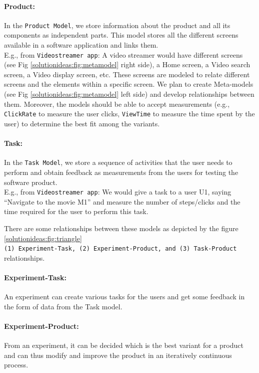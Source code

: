 \paragraph{Product:} In the \texttt{Product Model}, we store information about the product and all its components as independent parts.
This model stores all the different screens available in a software application and links them.\\
E.g., from \texttt{Videostreamer app}: A video streamer would have different screens (see Fig \ref{solutionideas:fig:metamodel} right side), a Home screen, a Video search screen, a Video display screen, etc. 
These screens are modeled to relate different screens and the elements within a specific screen. 
We plan to create Meta-models  (see Fig \ref{solutionideas:fig:metamodel} left side) and develop relationships between them. 
Moreover, the models should be able to accept measurements (e.g., \texttt{ClickRate} to measure the user clicks, \texttt{ViewTime} to measure the time spent by the user) to determine the best fit among the variants.

\paragraph{Task:} In the \texttt{Task Model}, we store a sequence of activities that the user needs to perform and obtain feedback as measurements from the users for testing the software product.\\
E.g., from \texttt{Videostreamer app}: We would give a task to a user U1, saying ``Navigate to the movie M1'' and measure the number of steps/clicks and the time required for the user to perform this task.

There are some relationships between these models as depicted by the figure \ref{solutionideas:fig:triangle} \\ 
\texttt{(1) Experiment-Task, (2) Experiment-Product, and (3) Task-Product} relationships.

\paragraph{Experiment-Task:} An experiment can create various tasks for the users and get some feedback in the form of data from the Task model. 

\paragraph{Experiment-Product:} From an experiment, it can be decided which is the best variant for a product and can thus modify and improve the product in an iteratively continuous process.

